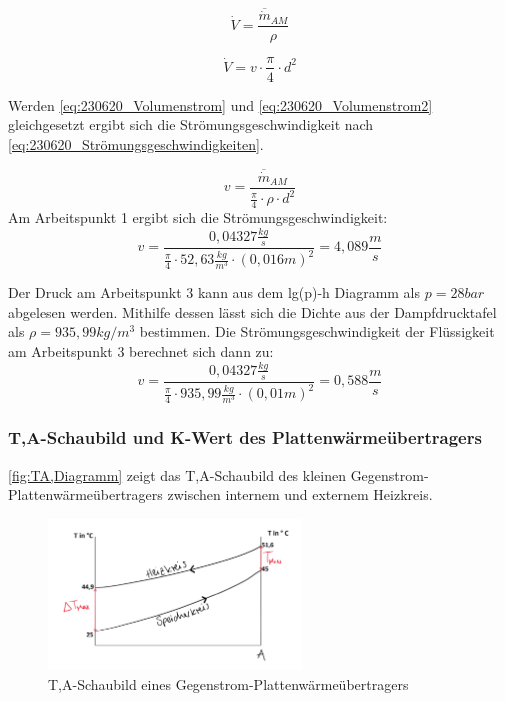 \begin{equation}
    \dot{V}= \frac{\overline{\dot m}_{AM}}{\rho }
    \label{eq:230620_Volumenstrom}
\end{equation}

\begin{equation}
    \dot{V}= v \cdot \frac{\pi}{4} \cdot d^2
    \label{eq:230620_Volumenstrom2}
\end{equation}

Werden \autoref{eq:230620_Volumenstrom} und \autoref{eq:230620_Volumenstrom2} gleichgesetzt ergibt sich die Strömungsgeschwindigkeit nach \autoref{eq:230620_Strömungsgeschwindigkeiten}.

\begin{equation}
    v = \frac{\overline{\dot m}_{AM}}{\frac{\pi}{4}\cdot \rho \cdot d^2}
    \label{eq:230620_Strömungsgeschwindigkeiten}
\end{equation}
Am Arbeitspunkt 1 ergibt sich die Strömungsgeschwindigkeit:
$$v=\frac{0,04327 \frac{kg}{s}}{\frac{\pi}{4}\cdot 52,63 \frac{kg}{m^3} \cdot (0,016 m)^2}=4,089 \frac{m}{s} $$

Der Druck am Arbeitspunkt 3 kann aus dem lg(p)-h Diagramm als $p=28 bar$ abgelesen werden. Mithilfe dessen lässt sich die Dichte aus der Dampfdrucktafel als $\rho=935,99 kg/m^3$ bestimmen.
Die Strömungsgeschwindigkeit der Flüssigkeit am Arbeitspunkt 3 berechnet sich dann zu:
$$v=\frac{0,04327 \frac{kg}{s}}{\frac{\pi}{4}\cdot 935,99\frac{kg}{m^3} \cdot (0,01 m)^2}=0,588 \frac{m}{s}$$
\newpage
\subsubsection{T,A-Schaubild und K-Wert des Plattenwärmeübertragers}

\autoref{fig:TA,Diagramm} zeigt das T,A-Schaubild des kleinen Gegenstrom-Plattenwärmeübertragers
zwischen internem und externem Heizkreis.

\begin{figure}[!h]
    \centering
    \includegraphics[width=0.6\textwidth]{Abbildungen/T_A_Diagramm.png}
    \caption{T,A-Schaubild eines Gegenstrom-Plattenwärmeübertragers}
    \label{fig:TA,Diagramm}
\end{figure}

